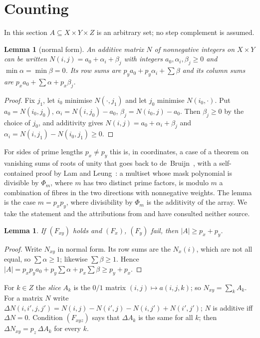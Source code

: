 \documentclass[11pt,a4paper]{amsart}
\newtheorem{lemma}[theorem]{Lemma}
\theoremstyle{definition}
\theoremstyle{remark}
\begin{document}
\section{Counting}\label{N:sec:count}

In this section $A\subseteq X\times Y\times Z$ is an arbitrary set; no step complement is assumed.

\begin{lemma}[normal form]\label{N:lem:nf}
An additive matrix $N$ of nonnegative integers on $X\times Y$ can be written $N(i,j)=a_0+\alpha_i+\beta_j$ with
integers $a_0,\alpha_i,\beta_j\ge 0$ and $\min\alpha=\min\beta=0$. Its row sums are
$p_ya_0+p_y\alpha_i+\sum\beta$ and its column sums are $p_xa_0+\sum\alpha+p_x\beta_j$.
\end{lemma}
\begin{proof}
Fix $j_1$, let $i_0$ minimise $N(\cdot,j_1)$ and let $j_0$ minimise $N(i_0,\cdot)$. Put $a_0=N(i_0,j_0)$,
$\alpha_i=N(i,j_0)-a_0$, $\beta_j=N(i_0,j)-a_0$. Then $\beta_j\ge 0$ by the choice of $j_0$, and additivity gives
$N(i,j)=a_0+\alpha_i+\beta_j$ and $\alpha_i=N(i,j_1)-N(i_0,j_1)\ge 0$.
\end{proof}

\noindent For sides of prime lengths $p_x\ne p_y$ this is, in coordinates, a case of a theorem on vanishing sums
of roots of unity that goes back to de~Bruijn~\cite{Bru}, with a self-contained proof by Lam and
Leung~\cite[Theorem~3.3]{LL}: a multiset whose mask polynomial is divisible by $\Phi_m$, where $m$ has two
distinct prime factors, is modulo $m$ a combination of fibres in the two directions with nonnegative weights.
The lemma is the case $m=p_xp_y$, where divisibility by $\Phi_m$ is the additivity of the array. We take the
statement and the attributions from \cite[Lemma~2.3]{KLaMS} and have consulted neither source.

\begin{lemma}\label{N:lem:three}
If $(F_{xy})$ holds and $(F_x)$, $(F_y)$ fail, then $|A|\ge p_x+p_y$.
\end{lemma}
\begin{proof}
Write $N_{xy}$ in normal form. Its row sums are the $N_x(i)$, which are not all equal, so $\sum\alpha\ge 1$;
likewise $\sum\beta\ge1$. Hence $|A|=p_xp_ya_0+p_y\sum\alpha+p_x\sum\beta\ge p_y+p_x$.
\end{proof}

For $k\in Z$ the \emph{slice} $A_k$ is the $0/1$ matrix $(i,j)\mapsto a(i,j,k)$; so $N_{xy}=\sum_kA_k$. For a
matrix $N$ write $\Delta N(i,i',j,j')=N(i,j)-N(i',j)-N(i,j')+N(i',j')$; $N$ is additive iff $\Delta N=0$.
Condition $(F_{xyz})$ says that $\Delta A_k$ is the same for all $k$; then $\Delta N_{xy}=p_z\,\Delta A_k$ for
every $k$.
\end{document}
